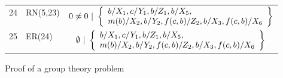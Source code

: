 \begin{figure}[t]
\begin{center}
\begin{tabular}{clc}
  24 & RN(5,23) &
  $ \clauseWithSubst{
      0 \not\approx 0
    }{ \left\{
      \begin{array}{l}
        \mapVar{X_1}b, \mapVar{Y_1}c, \mapVar{Z_1}b, \mapVar{X_5}b,  \\
        \mapVar{X_2}{m(b)}, \mapVar{Y_2}{b}, \mapVar{Z_2}{f(c,b)},
           \mapVar{X_3}{b}, \mapVar{X_6}{f(c,b)}
      \end{array} \right\}
    }$
  \\

  25 & ER(24) &
  $ \clauseWithSubst{
      \emptyset
    }{ \left\{
      \begin{array}{l}
        \mapVar{X_1}b, \mapVar{Y_1}c, \mapVar{Z_1}b, \mapVar{X_5}b,  \\
        \mapVar{X_2}{m(b)}, \mapVar{Y_2}{b}, \mapVar{Z_2}{f(c,b)},
           \mapVar{X_3}{b}, \mapVar{X_6}{f(c,b)}
      \end{array} \right\}
    }$
  \\

  \bottomrule
\end{tabular}
\caption{Proof of a group theory problem}
\label{fig:unit-sup-proof-example}
\end{center}
\end{figure}

